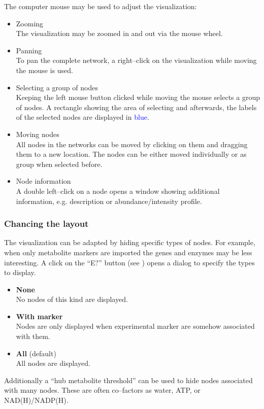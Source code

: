 \documentclass[titlepage,a4paper,twoside,9pt]{article}
\newcommand{\mms}{metabolite markers\xspace}
\newcommand{\pref}[1]{\prettyref{#1}}
\begin{document}
The computer mouse may be used to adjust the visualization:
\begin{itemize}
	\item Zooming\\
		The visualization may be zoomed in and out via the mouse wheel.
	\item Panning\\
		To pan the complete network, a right--click on the visualization while
		moving the mouse is used.
	\item Selecting a group of nodes\\
		Keeping the left mouse button clicked while moving the mouse selects a
		group of nodes. A rectangle showing the area of selecting and
		afterwards, the labels of the selected nodes are displayed in
		\textcolor{blue}{blue}.
	\item Moving nodes\\
		All nodes in the networks can be moved by clicking on them and
		dragging them to a new location. The nodes can be either moved
		individually or as group when selected before.
	\item Node information\\
		A double left--click on a node opens a window showing additional
		information, e.g. description or abundance/intensity
		profile.
\end{itemize}
	

\subsubsection{Chancing the layout}\label{sssec:layout}

The visualization can be adapted by hiding specific types of nodes. For
example, when only \mms are imported the genes and enzymes may be less
interesting. A click on the ``E?'' button (see \pref{fig:network_visualization})
opens a dialog to specify the types to display.
\begin{itemize}
	\item \textbf{None}\\
		No nodes of this kind are displayed.
	\item \textbf{With marker}\\
		Nodes are only displayed when experimental marker are somehow
		associated with them.
	\item \textbf{All} (default)\\
		All nodes are displayed.
\end{itemize}

Additionally a ``hub metabolite threshold'' can be used to hide nodes
associated with many nodes. These are often co--factors as water, ATP, or
NAD(H)/NADP(H).
\end{document}
